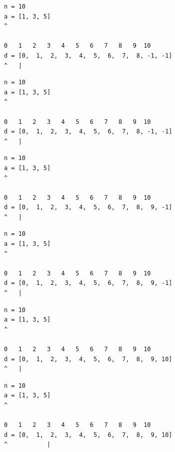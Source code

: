 \begin{frame}[fragile]
\begin{verbatim}
n = 10
a = [1, 3, 5]
^

0   1   2   3   4   5   6   7   8   9  10
d = [0,  1,  2,  3,  4,  5,  6,  7,  8, -1, -1]
^   |
\end{verbatim}
\end{frame}
\addtocounter{framenumber}{-1}

\begin{frame}[fragile]
\begin{verbatim}
n = 10
a = [1, 3, 5]
^

0   1   2   3   4   5   6   7   8   9  10
d = [0,  1,  2,  3,  4,  5,  6,  7,  8, -1, -1]
^   |
\end{verbatim}
\end{frame}
\addtocounter{framenumber}{-1}

\begin{frame}[fragile]
\begin{verbatim}
n = 10
a = [1, 3, 5]
^

0   1   2   3   4   5   6   7   8   9  10
d = [0,  1,  2,  3,  4,  5,  6,  7,  8,  9, -1]
^   |
\end{verbatim}
\end{frame}
\addtocounter{framenumber}{-1}

\begin{frame}[fragile]
\begin{verbatim}
n = 10
a = [1, 3, 5]
^

0   1   2   3   4   5   6   7   8   9  10
d = [0,  1,  2,  3,  4,  5,  6,  7,  8,  9, -1]
^   |
\end{verbatim}
\end{frame}
\addtocounter{framenumber}{-1}

\begin{frame}[fragile]
\begin{verbatim}
n = 10
a = [1, 3, 5]
^

0   1   2   3   4   5   6   7   8   9  10
d = [0,  1,  2,  3,  4,  5,  6,  7,  8,  9, 10]
^   |
\end{verbatim}
\end{frame}
\addtocounter{framenumber}{-1}

\begin{frame}[fragile]
\begin{verbatim}
n = 10
a = [1, 3, 5]
^

0   1   2   3   4   5   6   7   8   9  10
d = [0,  1,  2,  3,  4,  5,  6,  7,  8,  9, 10]
^           |
\end{verbatim}
\end{frame}
\addtocounter{framenumber}{-1}

